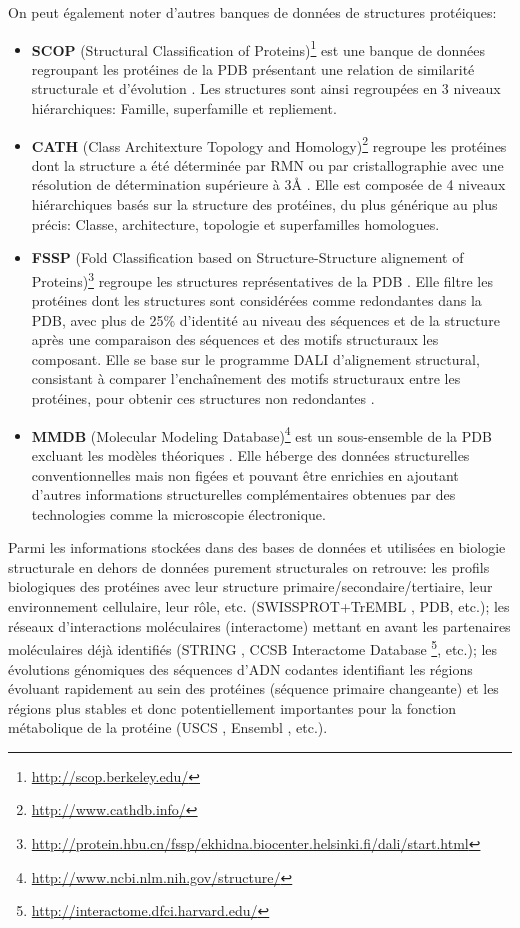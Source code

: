 On peut également noter d'autres banques de données de structures protéiques:
\begin{itemize}
  \item \textbf{SCOP} (Structural Classification of Proteins)\footnote{\url{http://scop.berkeley.edu/}} est une banque de données regroupant les protéines de la PDB présentant une relation de similarité structurale et d'évolution \cite{murzin1995scop}. Les structures sont ainsi regroupées en 3 niveaux hiérarchiques: Famille, superfamille et repliement.
  \item \textbf{CATH} (Class Architexture Topology and Homology)\footnote{\url{http://www.cathdb.info/}} regroupe les protéines dont la structure a été déterminée par RMN ou par cristallographie avec une résolution de détermination supérieure à 3\r{A} \cite{sillitoe2015cath}. Elle est composée de 4 niveaux hiérarchiques basés sur la structure des protéines, du plus générique au plus précis: Classe, architecture, topologie et superfamilles homologues.
  \item \textbf{FSSP} (Fold Classification based on Structure-Structure alignement of Proteins)\footnote{\url{http://protein.hbu.cn/fssp/ekhidna.biocenter.helsinki.fi/dali/start.html}} regroupe les structures représentatives de la PDB \cite{holm1996mapping}. Elle filtre les protéines dont les structures sont considérées comme redondantes dans la PDB, avec plus de 25\% d'identité au niveau des séquences et de la structure après une comparaison des séquences et des motifs structuraux les composant. Elle se base sur le programme DALI d'alignement structural, consistant à comparer l’enchaînement des motifs structuraux entre les protéines, pour obtenir ces structures non redondantes \cite{holm1998touring}.
  \item \textbf{MMDB} (Molecular Modeling Database)\footnote{\url{http://www.ncbi.nlm.nih.gov/structure/}} est un sous-ensemble de la PDB excluant les modèles théoriques \cite{madej2014mmdb}. Elle héberge des données structurelles conventionnelles mais non figées et pouvant être enrichies en ajoutant d'autres informations structurelles complémentaires obtenues par des technologies comme la microscopie électronique.
\end{itemize}

Parmi les informations stockées dans des bases de données et utilisées en biologie structurale en dehors de données purement structurales on retrouve: les profils biologiques des protéines avec leur structure primaire/secondaire/tertiaire, leur environnement cellulaire, leur rôle, etc. (SWISSPROT+TrEMBL \cite{boeckmann2003swiss}, PDB, etc.); les réseaux d'interactions moléculaires (interactome) mettant en avant les partenaires moléculaires déjà identifiés (STRING \cite{Snel15092000}, CCSB Interactome Database \footnote{\url{http://interactome.dfci.harvard.edu/}}, etc.); les évolutions génomiques des séquences d'ADN codantes identifiant les régions évoluant rapidement au sein des protéines (séquence primaire changeante) et les régions plus stables et donc potentiellement importantes pour la fonction métabolique de la protéine (USCS \cite{kent2002human}, Ensembl \cite{hubbard2002ensembl}, etc.). 



